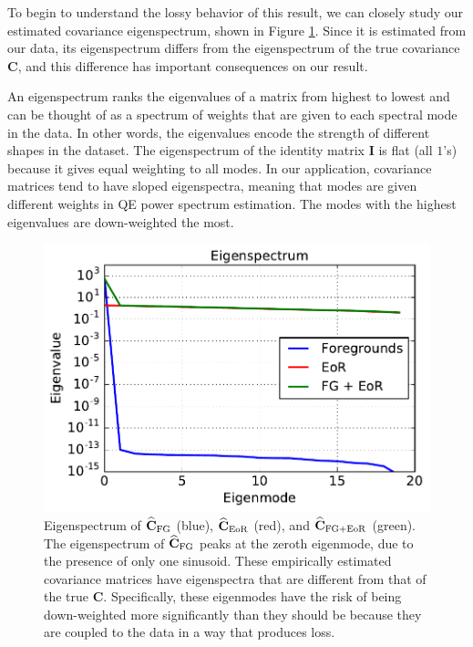 \documentclass[preprint2,numberedappendix,tighten]{aastex6}
\begin{document}
To begin to understand the lossy behavior of this result, we can closely study our estimated covariance eigenspectrum, shown in Figure \ref{fig:toy_sigloss2}. Since it is estimated from our data, its eigenspectrum differs from the eigenspectrum of the true covariance $\textbf{C}$, and this difference has important consequences on our result. 

An eigenspectrum ranks the eigenvalues of a matrix from 
highest to lowest and can be thought of as a spectrum of weights that are given to each spectral mode in the data. In other 
words, the eigenvalues encode the strength of different shapes in the dataset. The eigenspectrum of the identity matrix $
\textbf{I}$ is flat (all $1$'s) because it gives equal weighting to all modes. In our application, covariance matrices tend to have sloped eigenspectra, meaning that modes are given different weights in QE power spectrum estimation. The modes with the highest eigenvalues are 
down-weighted the most. 

\begin{figure}
	\centering
	\includegraphics[trim={0cm 0cm 0cm 0cm},clip,width=\columnwidth]{plots/toy_sigloss2.pdf}
	\caption{Eigenspectrum of $\widehat{\textbf{C}}_{\rm FG}$ (blue), $\widehat{\textbf{C}}_{\rm EoR}$ (red), and $\widehat{\textbf{C}}_{\rm FG+EoR}$ 
(green). The eigenspectrum of $\widehat{\textbf{C}}_{\rm FG}$ peaks at the zeroth eigenmode, due to the presence of only one 
sinusoid. These empirically estimated covariance matrices have eigenspectra that are different from that of the true $\textbf{C}$. Specifically, these eigenmodes have the risk of being down-weighted more significantly than they should be because they are coupled to the data in a way that produces loss.}
	\label{fig:toy_sigloss2}
\end{figure}
\end{document}
